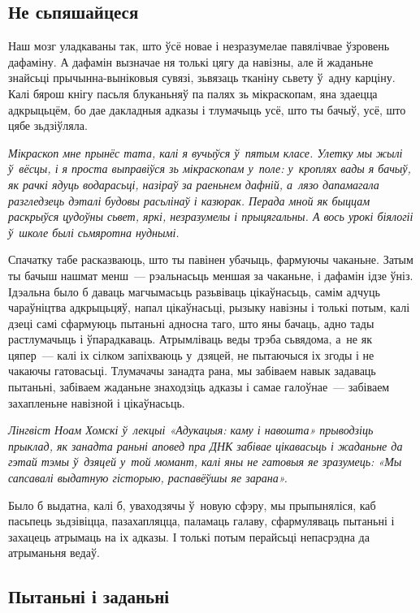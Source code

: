 \subsection*{Не сьпяшайцеся}

Наш мозг уладкаваны так, што ўсё новае і незразумелае павялічвае ўзровень дафаміну. А дафамін вызначае ня толькі цягу да навізны, але й жаданьне знайсьці прычынна-выніковыя сувязі, зьвязаць тканіну сьвету ў~адну карціну. Калі бярош кнігу пасьля блуканьняў па палях зь мікраскопам, яна здаецца адкрыцьцём, бо дае дакладныя адказы і тлумачыць усё, што ты бачыў, усё, што цябе зьдзіўляла. 

\emph{Мікраскоп мне прынёс тата, калі я вучыўся ў~пятым класе. Улетку мы жылі ў~вёсцы, і я проста выправіўся зь мікраскопам у~поле: у~кроплях вады я бачыў, як рачкі ядуць водарасьці, назіраў за раеньнем дафній, а~лязо дапамагала разгледзець дэталі будовы расьлінаў і казюрак. Перада мной як быццам раскрыўся цудоўны сьвет, яркі, незразумелы і прыцягальны. А вось урокі біялогіі ў~школе былі сьмяротна нуднымі.}

Спачатку табе расказваюць, што ты павінен убачыць, фармуючы чаканьне. Затым ты бачыш нашмат менш~--- рэальнасьць меншая за чаканьне, і дафамін ідзе ўніз. Ідэальна было б даваць магчымасьць разьвіваць цікаўнасьць, самім адчуць чараўніцтва адкрыцьцяў, напал цікаўнасьці, рызыку навізны і толькі потым, калі дзеці самі сфармуюць пытаньні адносна таго, што яны бачаць, адно тады растлумачыць і ўпарадкаваць. Атрымліваць веды трэба сьвядома, а~не як цяпер~--- калі іх сілком запіхваюць у~дзяцей, не пытаючыся іх згоды і не чакаючы гатовасьці. Тлумачачы занадта рана, мы забіваем навык задаваць пытаньні, забіваем жаданьне знаходзіць адказы і самае галоўнае~--- забіваем захапленьне навізной і цікаўнасьць.

\emph{Лінгвіст Ноам Хомскі ў~лекцыі «Адукацыя: каму і навошта» прыводзіць прыклад, як занадта раньні аповед пра ДНК забівае цікавасьць і жаданьне да гэтай тэмы ў~дзяцей у~той момант, калі яны не гатовыя яе зразумець: «Мы сапсавалі выдатную гісторыю, распавёўшы яе зарана».}

Было б выдатна, калі б, уваходзячы ў~новую сфэру, мы прыпыняліся, каб пасьпець зьдзівіцца, пазахапляцца, паламаць галаву, сфармуляваць пытаньні і захацець атрымаць на іх адказы. І толькі потым перайсьці непасрэдна да атрыманьня ведаў.

\subsection*{Пытаньні і заданьні}


